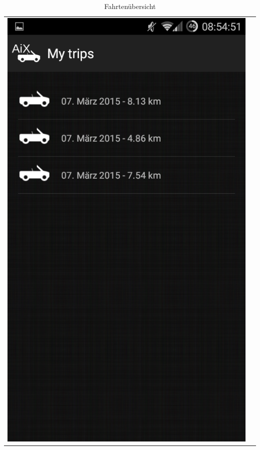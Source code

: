 \documentclass[12pt,a4paper,bibliography=totocnumbered,listof=totocnumbered]{scrartcl}
\begin{document}
\begin{table}
\begin{tabular}{c c}
\begin{minipage}{.5\textwidth}
  \centering
  \includegraphics[scale=0.3]{images/trips.png}
  \caption{Fahrtenübersicht}
  \label{trips}
\end{minipage}
&
\begin{minipage}{.5\textwidth}
  \centering

\end{minipage}
\end{tabular}
\end{table}
\end{document}
